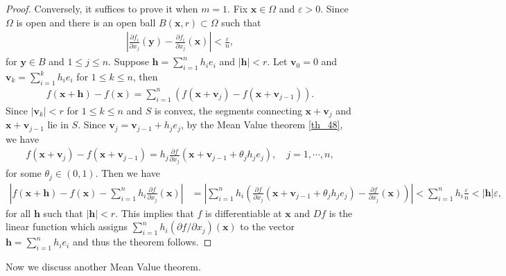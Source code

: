 \documentclass[10pt]{book}
\theoremstyle{definition}
\numberwithin{equation}{chapter}
\begin{document}
\begin{proof}
Conversely, it suffices to prove it when $m = 1$. Fix $\mathbf{x} \in \Omega$ and $\varepsilon > 0$. Since $\Omega$ is open and there is an open ball $B(\mathbf{x}, r) \subset \Omega$ such that
\begin{align*}
    \left|\frac{\partial f_i}{\partial x_j}(\mathbf{y}) - \frac{\partial f_i}{\partial x_j}(\mathbf{x})\right| < \frac{\varepsilon}{n},
\end{align*}
for $\mathbf{y} \in B$ and $1 \leq j \leq n$. Suppose $\mathbf{h} = \sum^n_{i=1} h_i e_i$ and $\left|\mathbf{h}\right| < r$. Let $\mathbf{v}_0 = 0$ and $\mathbf{v}_k = \sum^k_{i=1} h_i e_i$ for $1 \leq k \leq n$, then
\begin{align*}
    f(\mathbf{x} + \mathbf{h}) - f(\mathbf{x}) = \sum^n_{i=1} \left(f(\mathbf{x} + \mathbf{v}_j) - f(\mathbf{x} + \mathbf{v}_{j-1})\right).
\end{align*}
Since $\left|\mathbf{v}_k\right| < r$ for $1 \leq k \leq n$ and $S$ is convex, the segments connecting $\mathbf{x} + \mathbf{v}_j$ and $\mathbf{x} + \mathbf{v}_{j-1}$ lie in $S$. Since $\mathbf{v}_j = \mathbf{v}_{j-1} + h_j e_j$, by the Mean Value theorem \ref{th_48}, we have
\begin{align*}
    f(\mathbf{x} + \mathbf{v}_j) - f(\mathbf{x} + \mathbf{v}_{j-1}) = h_j\frac{\partial f}{\partial x_j}(\mathbf{x} + \mathbf{v}_{j-1} + \theta_j h_j e_j), \quad j = 1,\cdots,n,
\end{align*}
for some $\theta_j \in (0,1)$. Then we have
\begin{align*}
    \left|f(\mathbf{x} + \mathbf{h}) - f(\mathbf{x}) - \sum^n_{i=1} h_i \frac{\partial f}{\partial x_j}(\mathbf{x}) \right| & = \left|\sum^n_{i=1} h_i \left( \frac{\partial f}{\partial x_j}(\mathbf{x} + \mathbf{v}_{j-1} + \theta_j h_j e_j) - \frac{\partial f}{\partial x_j}(\mathbf{x}) \right) \right| < \sum^n_{i=1} h_i \frac{\varepsilon}{n} < \left|\mathbf{h}\right| \varepsilon,
\end{align*}
for all $\mathbf{h}$ such that $\left|\mathbf{h}\right| < r$. This implies that $f$ is differentiable at $\mathbf{x}$ and $Df$ is the linear function which assigns $\sum^n_{i=1} h_i (\partial f/\partial x_j)(\mathbf{x})$ to the vector $\mathbf{h} = \sum^n_{i=1} h_i e_i$ and thus the theorem follows.
\end{proof}

\medskip

Now we discuss another Mean Value theorem.

\medskip
\end{document}
